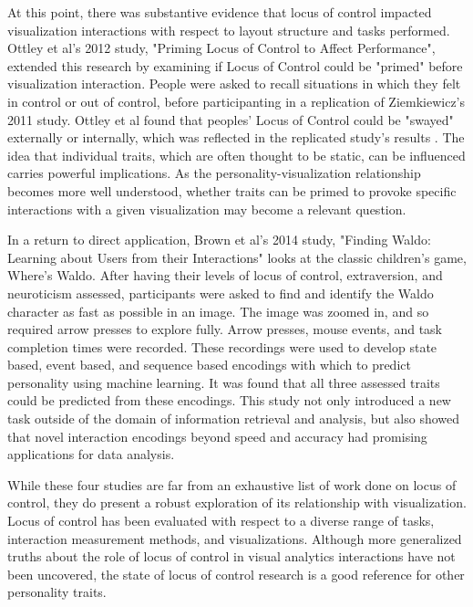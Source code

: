 \documentclass[conference]{IEEEtran}
\begin{document}
 At this point, there was substantive evidence that locus of control impacted
 visualization interactions with respect to layout structure
and tasks performed. Ottley et al's 2012 study, "Priming Locus of Control
to Affect Performance", extended this research by examining if Locus of Control
could be "primed" before visualization interaction. People were asked
to recall situations in which they felt in control or out of control, before
participanting in a replication of Ziemkiewicz's 2011 study. Ottley et al found
that peoples' Locus of Control could be "swayed" externally or internally, which
was reflected in the replicated study's results \cite{OttleyPriming}. The idea
that individual traits, which are often thought to be static, can be influenced
carries powerful implications. As the personality-visualization relationship
becomes more well understood, whether traits can be primed to provoke specific 
interactions with a given visualization may become a relevant question.

In a return to direct application, Brown et al's 2014 study, "Finding Waldo:
Learning about Users from their Interactions" looks at the classic children's
game, Where's Waldo. After having their levels of locus of control,
extraversion, and neuroticism assessed, participants were asked to find and
identify the Waldo character as fast as possible in an image. The image was
zoomed in, and so required arrow presses to explore fully. Arrow presses,
mouse events, and task completion times were recorded. These recordings
were used to develop state based, event based, and sequence based encodings
with which to predict personality using machine learning. It was found that
all three assessed traits could be predicted from these encodings\cite{Waldo}.
This study not only introduced a new task outside of the domain of information
retrieval and analysis, but also showed that novel interaction encodings beyond
speed and accuracy had promising applications for data analysis.

While these four studies are far from an exhaustive list of work done on
locus of control, they do present a robust exploration of its relationship with
visualization. Locus of control has been evaluated with respect to a diverse
range of tasks, interaction measurement methods, and visualizations. Although
more generalized truths about the role of locus of control in visual analytics
interactions have not been uncovered, the state of locus of control research
is a good reference for other personality traits.
\end{document}
